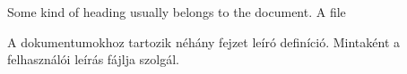 {
Some kind of heading usually belongs to the document.
}
{A  file}
{
A dokumentumokhoz tartozik néhány fejzet leíró definíció.
Mintaként a felhasználói leírás  fájlja szolgál.

}


